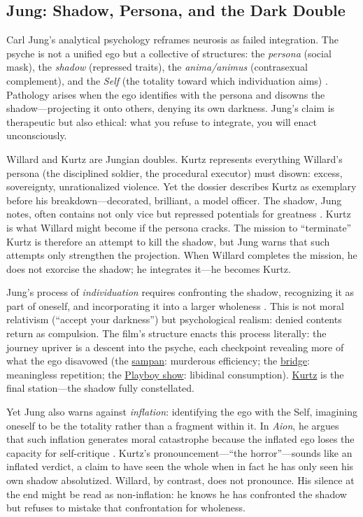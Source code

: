 \subsection*{Jung: Shadow, Persona, and the Dark Double}
\label{ssec:vi-jung}

Carl Jung's analytical psychology reframes neurosis as failed integration. The psyche is not a
unified ego but a collective of structures: the \emph{persona} (social mask), the
\emph{shadow} (repressed traits), the \emph{anima/animus} (contrasexual complement), and the
\emph{Self} (the totality toward which individuation aims) \parencite{JungArchetypes1969}.
Pathology arises when the ego identifies with the persona and disowns the shadow---projecting
it onto others, denying its own darkness. Jung's claim is therapeutic but also ethical: what
you refuse to integrate, you will enact unconsciously.

Willard and Kurtz are Jungian doubles. Kurtz represents everything Willard's persona (the
disciplined soldier, the procedural executor) must disown: excess, sovereignty,
unrationalized violence. Yet the dossier describes Kurtz as exemplary before his
breakdown---decorated, brilliant, a model officer. The shadow, Jung notes, often contains not
only vice but repressed potentials for greatness \parencite{JungArchetypes1969}. Kurtz is what
Willard might become if the persona cracks. The mission to ``terminate'' Kurtz is therefore an
attempt to kill the shadow, but Jung warns that such attempts only strengthen the projection.
When Willard completes the mission, he does not exorcise the shadow; he integrates it---he
becomes Kurtz.

Jung's process of \emph{individuation} requires confronting the shadow, recognizing it as part
of oneself, and incorporating it into a larger wholeness \parencite{JungArchetypes1969}. This
is not moral relativism (``accept your darkness'') but psychological realism: denied contents
return as compulsion. The film's structure enacts this process literally: the journey upriver
is a descent into the psyche, each checkpoint revealing more of what the ego disavowed (the
\hyperref[scene:sampan]{sampan}: murderous efficiency; the
\hyperref[scene:do-lung-bridge]{bridge}: meaningless repetition; the
\hyperref[scene:playboy-show]{Playboy show}: libidinal consumption).
\hyperref[scene:kurtz-compound]{Kurtz} is the final station---the shadow fully constellated.

Yet Jung also warns against \emph{inflation}: identifying the ego with the Self, imagining
oneself to be the totality rather than a fragment within it. In \textit{Aion}, he argues that
such inflation generates moral catastrophe because the inflated ego loses the capacity for
self-critique \parencite{JungAion1969}. Kurtz's pronouncement---``the horror''---sounds like
an inflated verdict, a claim to have seen the whole when in fact he has only seen his own
shadow absolutized. Willard, by contrast, does not pronounce. His silence at the end might be
read as non-inflation: he knows he has confronted the shadow but refuses to mistake that
confrontation for wholeness.

